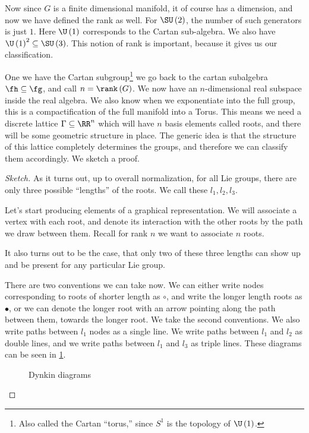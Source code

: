 \documentclass{booc}
\begin{document}
Now since $G$ is a finite dimensional manifold, it of course has a dimension,
and now we have defined the rank as well.
For $\SU\left( 2 \right)$, the number of such generators is just $1$. 
Here $\U\left( 1 \right) $ corresponds to the Cartan sub-algebra. 
We also have $\U\left( 1 \right)^2 \subseteq \SU\left( 3 \right)$. 
This notion of rank is important, because it gives us our classification. 

One we have the Cartan subgroup\footnote{
Also called the Cartan ``torus,'' since
$S^1$ is the topology of $\U\left( 1 \right)$.}
we go back to the cartan subalgebra $\fh\subseteq \fg$, 
and call $n = \rank\left( G \right)$.
We now have an $n$-dimensional real subspace inside the real algebra. 
We also know when we exponentiate into the full group, this is a compactification of
the full manifold into a Torus.
This means we need a discrete lattice $\Gamma\subseteq \RR^n$
which will have $n$ basis elements called roots, 
and there will be some geometric structure in place. 
The generic idea is that the structure of this lattice completely determines the groups, 
and therefore we can classify them accordingly.
We sketch a proof.

\begin{proof}[Sketch]
As it turns out, up to overall normalization, 
for all Lie groups, there are only three possible ``lengths'' of the roots.
We call these $l_1 , l_2 , l_3$.

Let's start producing elements of a graphical representation. 
We will associate a vertex with each root, and denote its interaction
with the other roots by the path we draw between them.
Recall for rank $n$ we want to associate $n$ roots.

It also turns out to be the case, 
that only two of these three lengths can show up and be present for 
any particular Lie group. 

There are two conventions we can take now. 
We can either write nodes corresponding to roots
of shorter length as $\circ$, and write the longer length roots
as $\bullet$, or we can denote the longer root with an arrow pointing along
the path between them, towards the longer root.
We take the second conventions.
We also write paths between $l_1$ nodes as a single line. 
We write paths between $l_1$ and $l_2$ as double lines, 
and we write paths between $l_1$ and $l_3$ as triple lines.
These diagrams can be seen in \cref{fig:dynkin}.
\begin{figure}[h!]
\caption{Dynkin diagrams}
\label{fig:dynkin}
\end{figure}
\end{proof}
\end{document}
